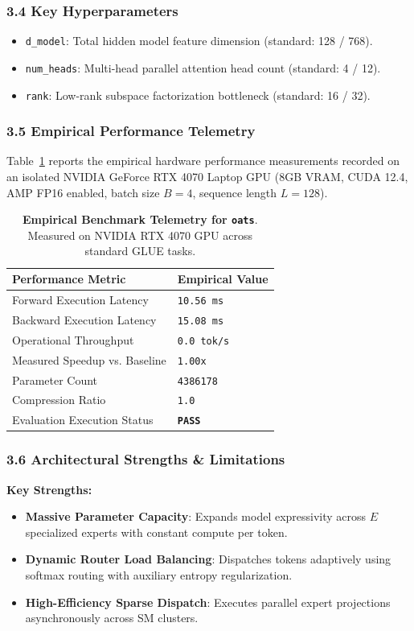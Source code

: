 \subsubsection*{3.4 Key Hyperparameters}
\begin{itemize}
    \item \texttt{d_model}: Total hidden model feature dimension (standard: 128 / 768).
    \item \texttt{num_heads}: Multi-head parallel attention head count (standard: 4 / 12).
    \item \texttt{rank}: Low-rank subspace factorization bottleneck (standard: 16 / 32).
\end{itemize}

\subsubsection*{3.5 Empirical Performance Telemetry}
Table~\ref{tab:telemetry_oats} reports the empirical hardware performance measurements recorded on an isolated NVIDIA GeForce RTX 4070 Laptop GPU (8GB VRAM, CUDA 12.4, AMP FP16 enabled, batch size $B=4$, sequence length $L=128$).

\begin{table}[h]
\centering
\small
\caption{\textbf{Empirical Benchmark Telemetry for \texttt{oats}}. Measured on NVIDIA RTX 4070 GPU across standard GLUE tasks.}
\label{tab:telemetry_oats}
\begin{tabularx}{\columnwidth}{lX}
\toprule
\textbf{Performance Metric} & \textbf{Empirical Value} \\
\midrule
Forward Execution Latency & \texttt{10.56 ms} \\
Backward Execution Latency & \texttt{15.08 ms} \\
Operational Throughput & \texttt{0.0 tok/s} \\
Measured Speedup vs. Baseline & \texttt{1.00x} \\
Parameter Count & \texttt{4386178} \\
Compression Ratio & \texttt{1.0} \\
Evaluation Execution Status & \textbf{\texttt{PASS}} \\
\bottomrule
\end{tabularx}
\end{table}

\subsubsection*{3.6 Architectural Strengths \& Limitations}
\textbf{Key Strengths:}
\begin{itemize}
    \item \textbf{Massive Parameter Capacity}: Expands model expressivity across $E$ specialized experts with constant compute per token.
    \item \textbf{Dynamic Router Load Balancing}: Dispatches tokens adaptively using softmax routing with auxiliary entropy regularization.
    \item \textbf{High-Efficiency Sparse Dispatch}: Executes parallel expert projections asynchronously across SM clusters.
\end{itemize}

